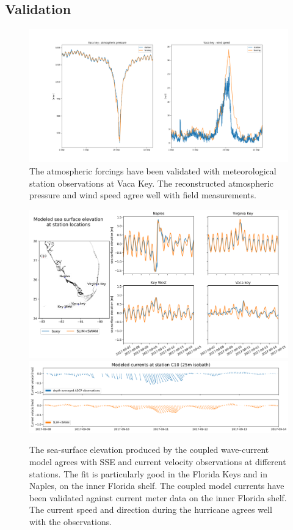 \documentclass[11pt,a4paper]{article}
\begin{document}
\subsection{Validation}
\begin{figure}
    \centering
    \includegraphics[width=.95\textwidth]{fig/validation_met.png}
    \caption{The atmospheric forcings have been validated with meteorological station observations at Vaca Key. The reconstructed atmospheric pressure and wind speed agree well with field measurements.}
    \label{fig:forcings}
\end{figure}

\begin{figure}
    \centering
    \includegraphics[width=.95\textwidth]{fig/elevation_with_map.png}
    \includegraphics[width=.95\textwidth]{fig/validation_currents_C10_ww3.png}
    \caption{The sea-surface elevation produced by the coupled wave-current model agrees with SSE and current velocity observations at different stations. The fit is particularly good in the Florida Keys and in Naples, on the inner Florida shelf. The coupled model currents have been validated against current meter data on the inner Florida shelf. The current speed and direction during the hurricane agrees well with the observations.}
    \label{fig:hydro}
\end{figure}
\end{document}
